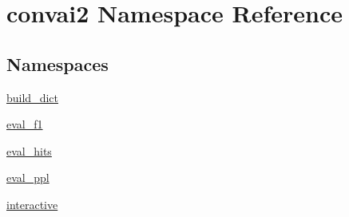 \hypertarget{namespaceconvai2}{}\section{convai2 Namespace Reference}
\label{namespaceconvai2}
\subsection*{Namespaces}
\begin{DoxyCompactItemize}
\item 
 \hyperlink{namespaceconvai2_1_1build__dict}{build\+\_\+dict}
\item 
 \hyperlink{namespaceconvai2_1_1eval__f1}{eval\+\_\+f1}
\item 
 \hyperlink{namespaceconvai2_1_1eval__hits}{eval\+\_\+hits}
\item 
 \hyperlink{namespaceconvai2_1_1eval__ppl}{eval\+\_\+ppl}
\item 
 \hyperlink{namespaceconvai2_1_1interactive}{interactive}
\end{DoxyCompactItemize}
